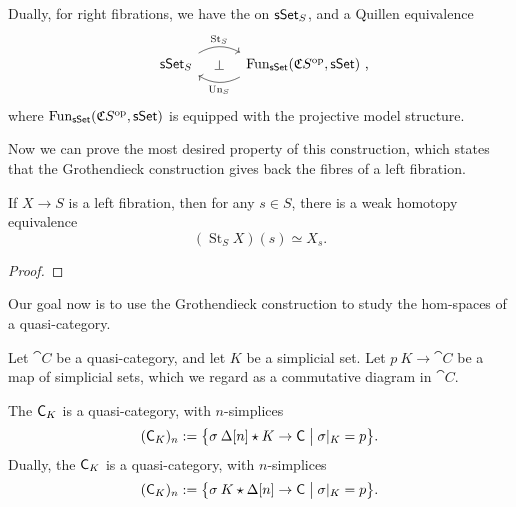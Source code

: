\begin{remark}
    Dually, for right fibrations, we have the 
    on $\mathsf{sSet}_{\/S}$, and a Quillen equivalence
    \[\begin{tikzcd}[column sep=3em]
        \cat{sSet}_{\/S}\ar[r,bend left,start anchor=north east,end anchor=north west,"\operatorname{St}_S"]
        \ar[r,phantom,"\bot"] &
        \operatorname{Fun}_{\cat{sSet}}(\mathfrak CS\op,\cat{sSet})\rlap{\ ,}
        \ar[l,bend left,start anchor=south west,end anchor=south east,"\operatorname{Un}_S"]
    \end{tikzcd}\]
    where $\operatorname{Fun}_{\mathsf{sSet}}(\mathfrak CS^{\mathrm{op}},\mathsf{sSet})$
    is equipped with the projective model structure. \varqed
\end{remark}

Now we can prove the most desired property of this construction,
which states that the Grothendieck construction 
gives back the fibres of a left fibration.

\begin{proposition}\label{thm-5-s}
    If $X\to S$ is a left fibration,
    then for any $s\in S$, there is a weak homotopy equivalence
    \[ (\operatorname{St}_SX)(s)\simeq X_s. \]
\end{proposition}

\begin{proof}
    \nyw
\end{proof}

Our goal now is to use the Grothendieck construction 
to study the hom-spaces of a quasi-category.

Let $\cat C$ be a quasi-category, and let $K$ be a simplicial set.
Let $p\:K\to\cat C$ be a map of simplicial sets,
which we regard as a commutative diagram in $\cat C$.

\begin{definition}
    The  $\mathsf{C}_{\/K}$ is a quasi-category,
    with $n$-simplices
    \[ (\mathsf{C}_{\/K})_n:=\bigl\{\sigma\:\Delta[n]\star K\to\mathsf{C}\mathrel{\big|}\sigma|_K=p\bigr\}. \]
    Dually, the  $\mathsf{C}_{K\/}$ is a quasi-category,
    with $n$-simplices
    \[ (\mathsf{C}_{K\/})_n:=\bigl\{\sigma\:K\star\Delta[n]\to\mathsf{C}\mathrel{\big|}\sigma|_K=p\bigr\}. \]
\end{definition}

